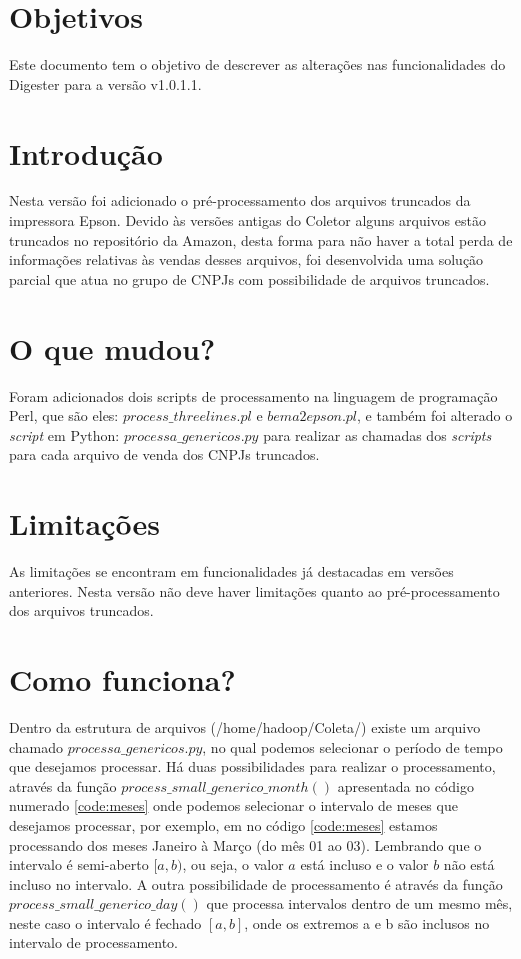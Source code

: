 \documentclass{article}      %
\newcommand{\versiondigester}{v1.0.1.1}
\begin{document}
\section{Objetivos}

Este documento tem o objetivo de descrever as alterações nas funcionalidades do Digester para a versão \versiondigester. 


\section{Introdução}     
Nesta versão foi adicionado o pré-processamento dos arquivos truncados da impressora Epson. Devido às versões antigas do Coletor alguns arquivos estão truncados no repositório da Amazon, desta forma para não haver a total perda de informações relativas às vendas desses arquivos, foi desenvolvida uma solução parcial que atua no grupo de CNPJs com possibilidade de arquivos truncados. 

\section{O que mudou?}
Foram adicionados dois scripts de processamento na linguagem de programação Perl, que são eles: $process\_threelines.pl$ e $bema2epson.pl$, e também foi alterado o \emph{script} em Python: $processa\_genericos.py$ para realizar as chamadas dos \emph{scripts} para cada arquivo de venda dos CNPJs truncados. 

\section{Limitações}
As limitações se encontram em funcionalidades já destacadas em versões anteriores. Nesta versão não deve haver limitações quanto ao pré-processamento dos arquivos truncados.

\section{Como funciona?}

Dentro da estrutura de arquivos (/home/hadoop/Coleta/) existe um arquivo chamado $processa\_genericos.py$, 
no qual podemos selecionar o período de tempo que desejamos processar. Há duas possibilidades para realizar o processamento, através da função $process\_small\_generico\_month()$ apresentada no código numerado \ref{code:meses} onde podemos selecionar o intervalo de meses que desejamos processar, por exemplo, em no código \ref{code:meses} estamos processando dos meses Janeiro à Março (do mês 01 ao 03). Lembrando que o intervalo é semi-aberto $[a,b)$, ou seja, o valor $a$ está incluso e o valor $b$ não está incluso no intervalo. A outra possibilidade de processamento é através da função $process\_small\_generico\_day()$ que processa intervalos dentro de um mesmo mês, neste caso o intervalo é fechado $[a,b]$, onde os extremos a e b são inclusos no intervalo de processamento.    
\end{document}
